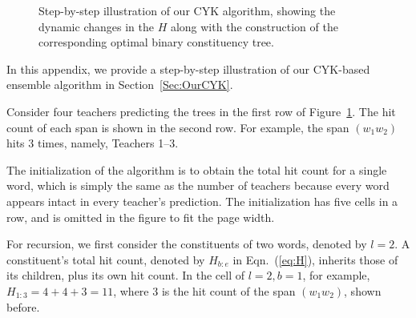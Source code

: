 \documentclass{article}
\begin{document}
\begin{figure}[!b]
{
}
    \caption{Step-by-step illustration of our CYK algorithm, showing the dynamic changes in the $H$ along with the construction of the corresponding optimal binary constituency tree.}
    \label{fig:illustration}
\end{figure}
In this appendix, we provide a step-by-step illustration of our CYK-based ensemble algorithm in Section~\ref{Sec:OurCYK}.

Consider four teachers predicting the trees in the first row of Figure~\ref{fig:illustration}. The hit count of each span is shown in the second row. For example, the span $(w_1w_2)$ hits $3$ times, namely, Teachers 1--3. 

The initialization of the algorithm is to obtain the total hit count for a single word, which is simply the same as the number of teachers because every word appears intact in every teacher's prediction. The initialization has five cells in a row, and is omitted in the figure to fit the page width.

For recursion, we first consider the constituents of two words, denoted by $l=2$. A constituent's total hit count, denoted by $H_{b:e}$ in Eqn.~(\ref{eq:H}), inherits those of its children, plus its own hit count. In the cell of $l=2,b=1$, for example, $H_{1:3}=4+4+3=11$, where $3$ is the hit count of the span $(w_1w_2)$, shown before. 
\end{document}
